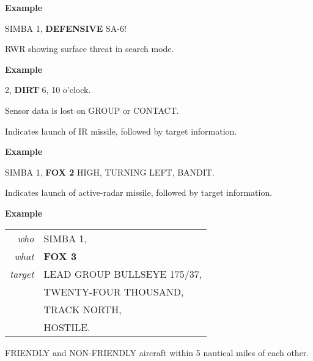 \begin{tcoloritemize}
    \medskip
    \textbf{Example}
    \begin{center}
        \begin{minipage}{0.9\textwidth}
            SIMBA 1, \textbf{DEFENSIVE} SA-6!
        \end{minipage}
    \end{center}

    \blueitem[DIRT]
    RWR showing surface threat in search mode.

    \medskip
    \textbf{Example}
    \begin{center}
        \begin{minipage}{0.9\textwidth}
            2, \textbf{DIRT} 6, 10 o'clock.
        \end{minipage}
    \end{center}

    \blueitem[FADED] 
    Sensor data is lost on GROUP or CONTACT.

    \blueitem[FOX 2]
    Indicates launch of IR missile,
    followed by target information.

    \medskip
    \textbf{Example}
    \begin{center}
        \begin{minipage}{0.9\textwidth}
            SIMBA 1, \textbf{FOX 2} HIGH, TURNING LEFT, BANDIT.
        \end{minipage}
    \end{center}

    \blueitem[FOX 3]
    Indicates launch of active-radar missile,
    followed by target information.

    \medskip
    \textbf{Example}
    \begin{center}
        \begin{tabular}{>{\itshape}r l}
            who & SIMBA 1, \\
            what & \textbf{FOX 3} \\
            target & LEAD GROUP BULLSEYE 175/37, \\
            & TWENTY-FOUR THOUSAND, \\
            & TRACK NORTH, \\
            & HOSTILE. \\
        \end{tabular}
    \end{center}

    \blueitem[FURBALL]
    FRIENDLY and NON-FRIENDLY aircraft within 5 nautical miles of each other.


\end{tcoloritemize}
